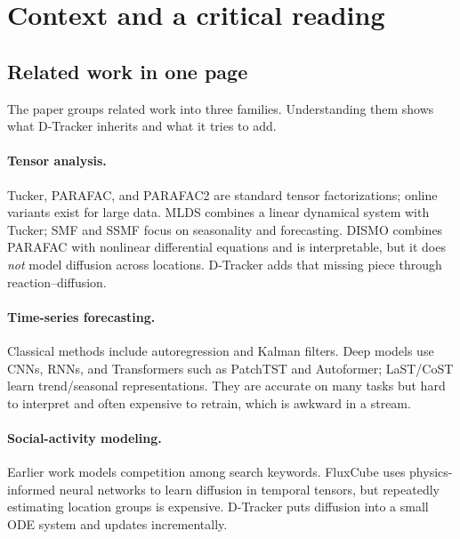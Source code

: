 \section{Context and a critical reading}
\label{sec:discussion}

\subsection{Related work in one page}

The paper groups related work into three families. Understanding them shows what D-Tracker inherits
and what it tries to add.

\paragraph{Tensor analysis.}
Tucker, PARAFAC, and PARAFAC2 are standard tensor factorizations; online variants exist for large data.
MLDS combines a linear dynamical system with Tucker; SMF and SSMF focus on seasonality and forecasting.
DISMO combines PARAFAC with nonlinear differential equations and is interpretable, but it does
\emph{not} model diffusion across locations. D-Tracker adds that missing piece through
reaction--diffusion.

\paragraph{Time-series forecasting.}
Classical methods include autoregression and Kalman filters. Deep models use CNNs, RNNs, and
Transformers such as PatchTST and Autoformer; LaST/CoST learn trend/seasonal representations. They are
accurate on many tasks but hard to interpret and often expensive to retrain, which is awkward in a
stream.

\paragraph{Social-activity modeling.}
Earlier work models competition among search keywords. FluxCube uses physics-informed neural networks
to learn diffusion in temporal tensors, but repeatedly estimating location groups is expensive.
D-Tracker puts diffusion into a small ODE system and updates incrementally.

